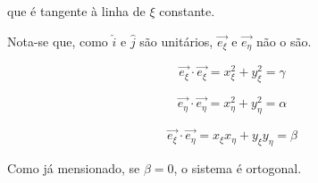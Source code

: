 que é tangente à linha de $\xi$ constante.

Nota-se que, como $\hat{i}$ e $\hat{j}$ são unitários, $\vec{e_\xi}$ e $\vec{e_\eta}$ não o são.

\begin{equation}
    \label{eq:2.26}
    \vec{e_\xi} \cdot \vec{e_\xi} = x_\xi^2 + y_\xi^2 = \gamma
\end{equation}

\begin{equation}
    \label{eq:2.27}
    \vec{e_\eta} \cdot \vec{e_\eta} = x_\eta^2 + y_\eta^2 = \alpha
\end{equation}

\begin{equation}
    \label{eq:2.28}
    \vec{e_\xi} \cdot \vec{e_\eta} = x_\xi x_\eta + y_\xi y_\eta = \beta
\end{equation}

Como já mensionado, se $\beta = 0$, o sistema é ortogonal.